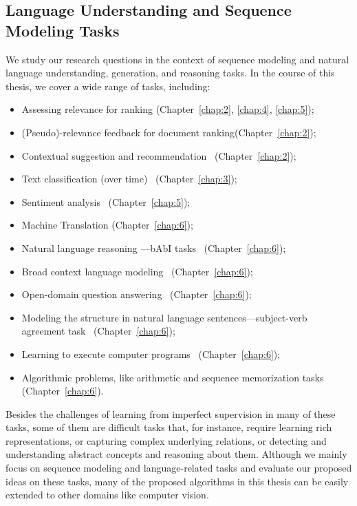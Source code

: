 \subsection{Language Understanding and Sequence Modeling Tasks}
We study our research questions in the context of sequence modeling and natural language understanding, generation, and reasoning tasks. In the course of this thesis, we cover a wide range of tasks, including:
\begin{itemize}
\item 
Assessing relevance for ranking (Chapter~\ref{chap:2}, \ref{chap:4}, \ref{chap:5});
%
\item 
(Pseudo)-relevance feedback for document ranking(Chapter~\ref{chap:2});
%
\item 
Contextual suggestion and recommendation~\citep{hashemioverview} (Chapter~\ref{chap:2});
%
\item 
Text classification (over time)~\citep{Hirst:2014} (Chapter~\ref{chap:3});
%
\item 
Sentiment analysis~\citep{rosenthal2017semeval, Nakov:2016, rosenthal:2015} (Chapter~\ref{chap:5}); 
%
\item 
Machine Translation (Chapter~\ref{chap:6});
%
\item 
Natural language reasoning ---bAbI tasks~\citep{weston2015towards} (Chapter~\ref{chap:6});
%
\item 
Broad context language modeling~\citep{paperno2016lambada} (Chapter~\ref{chap:6});
%
\item 
Open-domain question answering~\citep{dunn2017searchqa, dhingra2017quasar} (Chapter~\ref{chap:6});
%
\item 
Modeling the structure in natural language sentences---subject-verb agreement task~\citep{linzen2016assessing} (Chapter~\ref{chap:6});
%
\item 
Learning to execute computer programs~\citep{ZS14} (Chapter~\ref{chap:6}); 
%
\item 
Algorithmic problems, like arithmetic and sequence memorization tasks ~\citep{neural_gpu} (Chapter~\ref{chap:6}).
\end{itemize}

Besides the challenges of learning from imperfect supervision in many of these tasks, some of them are difficult tasks that, for instance, require learning rich representations, or capturing complex underlying relations, or detecting and understanding abstract concepts and reasoning about them.
%
Although we mainly focus on sequence modeling and language-related tasks and evaluate our proposed ideas on these tasks, many of the proposed algorithms in this thesis can be easily extended to other domains like computer vision.
%

